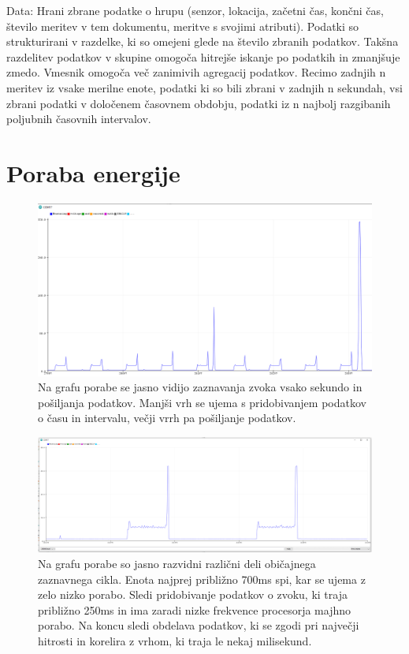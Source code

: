 \documentclass[a4paper, 12pt]{book}
\begin{document}
Data:
Hrani zbrane podatke o hrupu (senzor, lokacija, začetni čas, končni čas, število meritev v tem dokumentu, meritve s svojimi atributi). Podatki so strukturirani v razdelke, ki so omejeni glede na število zbranih podatkov. Takšna razdelitev podatkov v skupine omogoča hitrejše iskanje po podatkih in zmanjšuje zmedo. Vmesnik omogoča več zanimivih agregacij podatkov. Recimo zadnjih n meritev iz vsake merilne enote, podatki ki so bili zbrani v zadnjih n sekundah, vsi zbrani podatki v določenem časovnem obdobju, podatki iz n najbolj razgibanih poljubnih časovnih intervalov.


\section{Poraba energije}



\begin{figure}[H]
    \centering
    \includegraphics[width=\linewidth]{slikovno_gradivo/poraba-graf1.png}
    \caption{Na grafu porabe se jasno vidijo zaznavanja zvoka vsako sekundo in pošiljanja podatkov. Manjši vrh se ujema s pridobivanjem podatkov o času in intervalu, večji vrrh pa pošiljanje podatkov.}
    \label{fig:poraba1}
\end{figure}

\begin{figure}[H]
    \centering
    \includegraphics[width=\linewidth]{slikovno_gradivo/poraba-graf2.png}
    \caption{Na grafu porabe so jasno razvidni različni deli običajnega zaznavnega cikla. Enota najprej približno 700ms spi, kar se ujema z zelo nizko porabo. Sledi pridobivanje podatkov o zvoku, ki traja približno 250ms in ima zaradi nizke frekvence procesorja majhno porabo. Na koncu sledi obdelava podatkov, ki se zgodi pri največji hitrosti in korelira z vrhom, ki traja le nekaj milisekund.}
    \label{fig:poraba2}
\end{figure}
\end{document}

